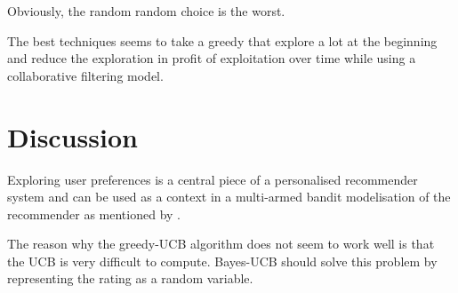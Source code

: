 \documentclass[letterpaper]{article}
\begin{document}
Obviously, the random random choice is the worst.

The best techniques seems to take a greedy that explore a lot at the beginning and reduce the exploration in profit of exploitation over time while using a collaborative filtering model.

\section{Discussion}

Exploring user preferences is a central piece of a personalised recommender system and can be used as a context in a multi-armed bandit modelisation of the recommender as mentioned by \cite{main}.




The reason why the greedy-UCB algorithm does not seem to work well is that the UCB is very difficult to compute. Bayes-UCB should solve this problem by representing the rating as a random variable.





\end{document}
